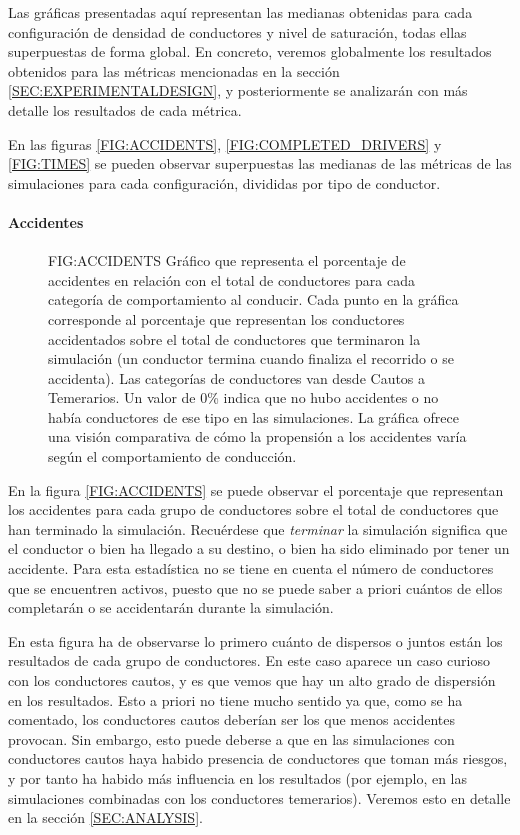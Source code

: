 Las gráficas presentadas aquí representan las medianas obtenidas para cada configuración de densidad de conductores y nivel de saturación,
todas ellas superpuestas de forma global.
En concreto, veremos globalmente los resultados obtenidos para las métricas mencionadas en la sección \ref{SEC:EXPERIMENTALDESIGN},
y posteriormente se analizarán con más detalle los resultados de cada métrica.

En las figuras \ref{FIG:ACCIDENTS}, \ref{FIG:COMPLETED_DRIVERS} y \ref{FIG:TIMES} se pueden observar superpuestas las medianas de
las métricas de las simulaciones para cada configuración, divididas por tipo de conductor.

\paragraph{Accidentes}

\begin{figure}[Porcentaje de accidentes por tipo de conductor.]{FIG:ACCIDENTS}{
    Gráfico que representa el porcentaje de accidentes en relación con el total de conductores
    para cada categoría de comportamiento al conducir. Cada punto en la gráfica corresponde al porcentaje que representan los conductores accidentados sobre el total de conductores que terminaron la simulación (un conductor termina cuando finaliza el recorrido o se accidenta).
    Las categorías de conductores van desde Cautos a Temerarios. Un valor de 0\% indica que no hubo accidentes o no había conductores de ese tipo en las simulaciones. La gráfica ofrece una visión comparativa de cómo la propensión a los accidentes varía según el comportamiento de conducción.}
\end{figure}

En la figura \ref{FIG:ACCIDENTS} se puede observar el porcentaje que representan los accidentes para cada grupo de conductores sobre el total de conductores que han terminado la simulación.
Recuérdese que \textit{terminar} la simulación significa que el conductor o bien ha llegado a su destino, o bien ha sido eliminado por tener un accidente.
Para esta estadística no se tiene en cuenta el número de conductores que se encuentren activos, puesto que no se puede saber a priori cuántos de ellos
completarán o se accidentarán durante la simulación.

En esta figura ha de observarse lo primero cuánto de dispersos o juntos están los resultados de cada grupo de conductores. En este caso aparece un caso curioso
con los conductores cautos, y es que vemos que hay un alto grado de dispersión en los resultados. Esto a priori no tiene mucho sentido ya que, como se ha comentado,
los conductores cautos deberían ser los que menos accidentes provocan. Sin embargo, esto puede deberse a que en las simulaciones con conductores cautos haya habido presencia de conductores que toman más riesgos, y por tanto
ha habido más influencia en los resultados (por ejemplo, en las simulaciones combinadas con los conductores temerarios). Veremos esto en detalle en la sección
\ref{SEC:ANALYSIS}.

